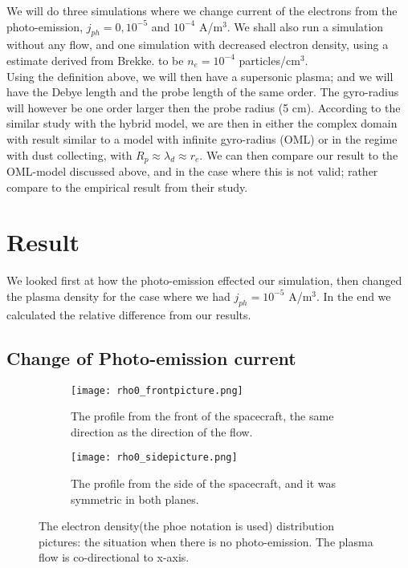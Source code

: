 \documentclass[aip, 
rsi, 
amsmath,
amssymb,
longbibliography,
reprint]{revtex4-1}
\begin{document}
 We will do three simulations where we change current of the electrons from the photo-emission, $j_{ph} = 0, 10^{-5}$ and $10^{-4}$ A/m$^3$. We shall also run a simulation without any flow, and one simulation with decreased electron density, using a estimate derived from Brekke.\cite{Brekke} to be $n_e = 10^{-4}$ particles/cm$^3$.\\
 
Using the definition above, we will then have a supersonic plasma; and we will have the Debye length and the probe length of the same order. The gyro-radius will however be one order larger then the probe radius (5 cm). According to the similar study with the hybrid model\cite{P7}, we are then in either the complex domain with result similar to a model with infinite gyro-radius (OML) or in the regime with dust collecting, with $R_p \approx \lambda_d \approx r_e$. We can then compare our result to the OML-model discussed above, and in the case where this is not valid; rather compare to the empirical result from their study.

\section{Result}

We looked first at how the photo-emission effected our simulation, then changed the plasma density for the case where we had $j_{ph} = 10^{-5}$ A/m$^3$. In the end we calculated the relative difference from our results.

\subsection{Change of Photo-emission current}

\begin{figure*}
\begin{subfigure}{0.45\textwidth}
\texttt{[image: rho0\_frontpicture.png]}
\caption{The profile from the front of the spacecraft, the same direction as the direction of the flow.}
\end{subfigure}
\begin{subfigure}{0.45\textwidth}
\texttt{[image: rho0\_sidepicture.png]}
\caption{The profile from the side of the spacecraft, and it was symmetric in both planes.}
\end{subfigure}
\caption{The electron density(the phoe notation is used) distribution pictures: the situation when there is no photo-emission. The plasma flow is co-directional to x-axis.\label{fig:profile_nocurrent}}
\end{figure*}
\end{document}
